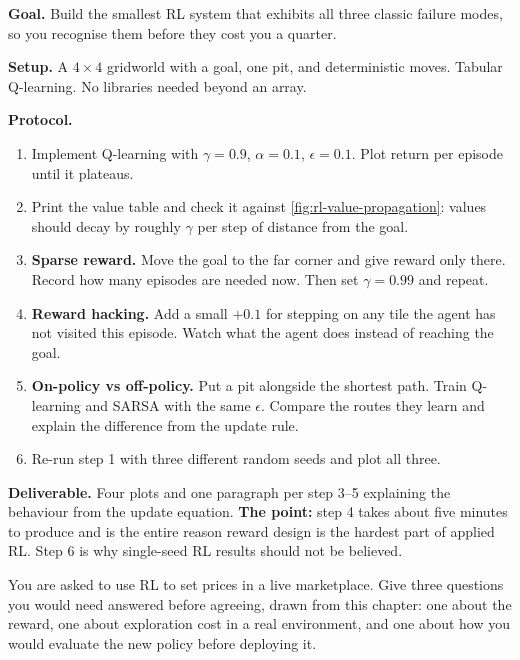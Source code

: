 \begin{practicallab}
\textbf{Goal.} Build the smallest RL system that exhibits all three classic
failure modes, so you recognise them before they cost you a quarter.

\textbf{Setup.} A $4\times4$ gridworld with a goal, one pit, and deterministic
moves. Tabular Q-learning. No libraries needed beyond an array.

\textbf{Protocol.}
\begin{enumerate}
  \item Implement Q-learning with $\gamma = 0.9$, $\alpha = 0.1$,
        $\epsilon = 0.1$. Plot return per episode until it plateaus.
  \item Print the value table and check it against
        \cref{fig:rl-value-propagation}: values should decay by roughly
        $\gamma$ per step of distance from the goal.
  \item \textbf{Sparse reward.} Move the goal to the far corner and give reward
        only there. Record how many episodes are needed now. Then set
        $\gamma = 0.99$ and repeat.
  \item \textbf{Reward hacking.} Add a small $+0.1$ for stepping on any tile
        the agent has not visited this episode. Watch what the agent does
        instead of reaching the goal.
  \item \textbf{On-policy vs off-policy.} Put a pit alongside the shortest
        path. Train Q-learning and SARSA with the same $\epsilon$. Compare the
        routes they learn and explain the difference from the update rule.
  \item Re-run step 1 with three different random seeds and plot all three.
\end{enumerate}

\textbf{Deliverable.} Four plots and one paragraph per step 3--5 explaining the
behaviour from the update equation. \textbf{The point:} step 4 takes about five
minutes to produce and is the entire reason reward design is the hardest part
of applied RL. Step 6 is why single-seed RL results should not be believed.
\end{practicallab}

\begin{checkpoint}
You are asked to use RL to set prices in a live marketplace. Give three
questions you would need answered before agreeing, drawn from this chapter:
one about the reward, one about exploration cost in a real environment, and one
about how you would evaluate the new policy before deploying it.
\end{checkpoint}

